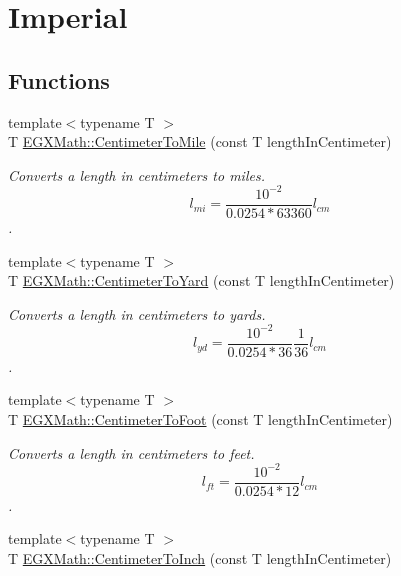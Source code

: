 \hypertarget{group___e_g_x_math-_conversions-_length_conversions-_centimeter-_imperial}{}\section{Imperial}
\label{group___e_g_x_math-_conversions-_length_conversions-_centimeter-_imperial}
\subsection*{Functions}
\begin{DoxyCompactItemize}
\item 
{\footnotesize template$<$typename T $>$ }\\T \mbox{\hyperlink{group___e_g_x_math-_conversions-_length_conversions-_centimeter-_imperial_gacba2e8c1f187fae381009e4413d5d4fb}{E\+G\+X\+Math\+::\+Centimeter\+To\+Mile}} (const T length\+In\+Centimeter)
\begin{DoxyCompactList}\small\item\em Converts a length in centimeters to miles. \[ l_{mi}=\frac{10^{-2}}{0.0254 * 63360} l_{cm} \]. \end{DoxyCompactList}\item 
{\footnotesize template$<$typename T $>$ }\\T \mbox{\hyperlink{group___e_g_x_math-_conversions-_length_conversions-_centimeter-_imperial_ga9b25beac97b6dfc0700508ca60760dfe}{E\+G\+X\+Math\+::\+Centimeter\+To\+Yard}} (const T length\+In\+Centimeter)
\begin{DoxyCompactList}\small\item\em Converts a length in centimeters to yards. \[ l_{yd}= \frac{10^{-2}}{0.0254 * 36} \frac{1}{36} l_{cm} \]. \end{DoxyCompactList}\item 
{\footnotesize template$<$typename T $>$ }\\T \mbox{\hyperlink{group___e_g_x_math-_conversions-_length_conversions-_centimeter-_imperial_ga27bbb3b1cf61bac428f40d6804e9aaec}{E\+G\+X\+Math\+::\+Centimeter\+To\+Foot}} (const T length\+In\+Centimeter)
\begin{DoxyCompactList}\small\item\em Converts a length in centimeters to feet. \[ l_{ft}= \frac{10^{-2}}{0.0254 * 12} l_{cm} \]. \end{DoxyCompactList}\item 
{\footnotesize template$<$typename T $>$ }\\T \mbox{\hyperlink{group___e_g_x_math-_conversions-_length_conversions-_centimeter-_imperial_ga9d90fd3e24ac92c43f57db3e27a24507}{E\+G\+X\+Math\+::\+Centimeter\+To\+Inch}} (const T length\+In\+Centimeter)

\end{DoxyCompactItemize}
